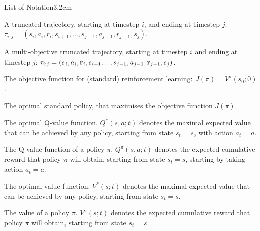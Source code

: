 \begin{mclistof}{List of Notation}{3.2cm}
    \item[$\tau_{i:j}$]
        A truncated trajectory, starting at timestep $i$, and ending at timestep $j$: $\tau_{i:j} = (s_i, a_i, r_i, s_{i+1}, ..., s_{j-1}, a_{j-1}, r_{j-1}, s_j)$. 
    \item[$\bff{\tau}_{i:j}$] 
        A multi-objective truncated trajectory, starting at timestep $i$ and ending at timestep $j$: $\mathbf{\tau}_{i:j} = (s_i, a_i, \mathbf{r}_i, s_{i+1}, ..., s_{j-1}, a_{j-1}, \mathbf{r}_{j-1}, s_j)$.
    \\
    \item[{\parbox[t]{\textwidth}{
            \Large\textbf{Reinforcement Learning (Section \ref{sec:2-3-rl})}\hfill\hfill
          }}]
    \item[$J(\pi)$] 
        The objective function for (standard) reinforcement learning: $J(\pi) = V^{\pi}(s_0;0)$.
    \item[$\pi^*$]
        The optimal standard policy, that maximises the objective function $J(\pi)$.
    \item[$Q^*$]
        The optimal Q-value function. $Q^*(s,a;t)$ denotes the maximal expected value that can be achieved by any policy, starting from state $s_t=s$, with action $a_t=a$.
    \item[$Q^{\pi}$]
        The Q-value function of a policy $\pi$. $Q^{\pi}(s,a;t)$ denotes the expected cumulative reward that policy $\pi$ will obtain, starting from state $s_t=s$, starting by taking action $a_t=a$.
    \item[$V^*$]
        The optimal value function. $V^*(s;t)$ denotes the maximal expected value that can be achieved by any policy, starting from state $s_t=s$.
    \item[$V^{\pi}$]
        The value of a policy $\pi$. $V^{\pi}(s;t)$ denotes the expected cumulative reward that policy $\pi$ will obtain, starting from state $s_t=s$.
    \\

\end{mclistof}
